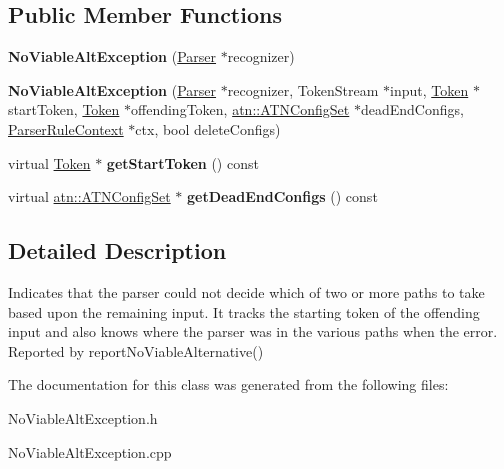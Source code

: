 \subsection*{Public Member Functions}
\begin{DoxyCompactItemize}
\item 
\mbox{\label{classantlr4_1_1NoViableAltException_a3a36e4d29560f3ff93b61209a17140de}} 
{\bfseries No\+Viable\+Alt\+Exception} (\hyperlink{classantlr4_1_1Parser}{Parser} $\ast$recognizer)
\item 
\mbox{\label{classantlr4_1_1NoViableAltException_ab3807d6565ec1238d02d57604b726956}} 
{\bfseries No\+Viable\+Alt\+Exception} (\hyperlink{classantlr4_1_1Parser}{Parser} $\ast$recognizer, Token\+Stream $\ast$input, \hyperlink{classantlr4_1_1Token}{Token} $\ast$start\+Token, \hyperlink{classantlr4_1_1Token}{Token} $\ast$offending\+Token, \hyperlink{classantlr4_1_1atn_1_1ATNConfigSet}{atn\+::\+A\+T\+N\+Config\+Set} $\ast$dead\+End\+Configs, \hyperlink{classantlr4_1_1ParserRuleContext}{Parser\+Rule\+Context} $\ast$ctx, bool delete\+Configs)
\item 
\mbox{\label{classantlr4_1_1NoViableAltException_a2aa17bd19a447caefb02a4b7412eb198}} 
virtual \hyperlink{classantlr4_1_1Token}{Token} $\ast$ {\bfseries get\+Start\+Token} () const
\item 
\mbox{\label{classantlr4_1_1NoViableAltException_af4879eed620656f49a4d0365eb27e64b}} 
virtual \hyperlink{classantlr4_1_1atn_1_1ATNConfigSet}{atn\+::\+A\+T\+N\+Config\+Set} $\ast$ {\bfseries get\+Dead\+End\+Configs} () const
\end{DoxyCompactItemize}


\subsection{Detailed Description}
Indicates that the parser could not decide which of two or more paths to take based upon the remaining input. It tracks the starting token of the offending input and also knows where the parser was in the various paths when the error. Reported by report\+No\+Viable\+Alternative() 

The documentation for this class was generated from the following files\+:\begin{DoxyCompactItemize}
\item 
No\+Viable\+Alt\+Exception.\+h\item 
No\+Viable\+Alt\+Exception.\+cpp\end{DoxyCompactItemize}
